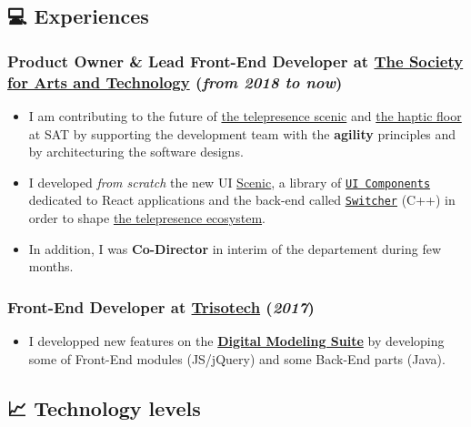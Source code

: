 \documentclass[11pt]{article}
\begin{document}
\subsection{💻 Experiences}
\label{sec:org297bb59}
\subsubsection{\textbf{Product Owner \& Lead Front-End Developer} at \href{https://sat.qc.ca/}{The Society for Arts and Technology} (\emph{from 2018 to now})}
\label{sec:org1320166}

\begin{itemize}
\item I am contributing to the future of \href{https://gitlab.com/sat-mtl/tools/scenic/scenic}{the telepresence scenic} and \href{https://gitlab.com/sat-mtl/tools/haptic-floor}{the haptic floor} at SAT by supporting the development team with the \textbf{agility} principles and by architecturing the software designs.
\item I developed \emph{from scratch} the new UI \href{https://gitlab.com/sat-mtl/tools/scenic/scenic}{Scenic}, a library of \href{https://gitlab.com/sat-mtl/tools/ui-components}{\texttt{UI Components}} dedicated to React applications and the back-end called \href{https://gitlab.com/sat-mtl/tools/switcher}{\texttt{Switcher}} (C++) in order to shape \href{https://telepresence-scenic.ca/}{the telepresence ecosystem}.
\item In addition, I was \textbf{Co-Director} in interim of the departement during few months.
\end{itemize}

\subsubsection{\textbf{Front-End Developer} at \href{https://www.trisotech.com/}{Trisotech} (\emph{2017})}
\label{sec:orgd46ad6a}

\begin{itemize}
\item I developped new features on the \href{https://www.trisotech.com/digital-modeling-suite/}{\textbf{Digital Modeling Suite}} by developing some of Front-End modules (JS/jQuery) and some Back-End parts (Java).
\end{itemize}

\subsection{📈 Technology levels}
\label{sec:orgcf24016}
\end{document}
